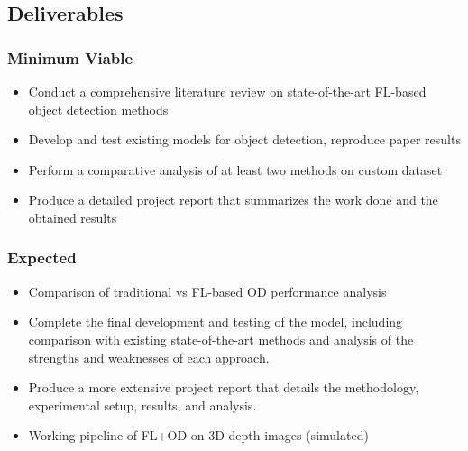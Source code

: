 \documentclass[thesis]{mas_proposal}
\begin{document}
\newpage
\subsection{Deliverables}
\subsubsection*{Minimum Viable}
\begin{itemize}
      \item Conduct a comprehensive literature review on state-of-the-art FL-based object detection methods
      \item Develop and test existing models for object detection, reproduce paper results
      \item Perform a comparative analysis of at least two methods on custom dataset
      \item Produce a detailed project report that summarizes the work done and the obtained results
\end{itemize}

\subsubsection*{Expected}
\begin{itemize}
      \item Comparison of traditional vs FL-based OD performance analysis
      \item Complete the final development and testing of the model, including comparison with existing state-of-the-art methods and analysis of the strengths and weaknesses of each approach.
      \item Produce a more extensive project report that details the methodology, experimental setup, results, and analysis.
      \item Working pipeline of FL+OD on 3D depth images (simulated)
\end{itemize}
\end{document}
